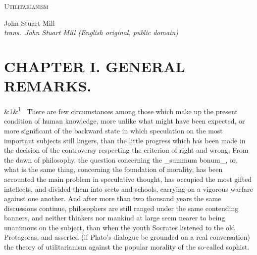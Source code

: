 \documentclass[12pt]{article}
\newcommand{\work}[1]{\begin{center}\LARGE\scshape #1\end{center}}
\newcommand{\attrib}[2]{\begin{center}\large #1\\[2pt]\small\itshape trans.\ #2\end{center}\vspace{1em}}
\newcommand{\para}[1][]{\par\noindent\ifx&#1&\else\textsuperscript{\footnotesize #1}~\fi}
\begin{document}
\work{Utilitarianism}
\attrib{John Stuart Mill}{John Stuart Mill (English original, public domain)}

\section*{CHAPTER I. GENERAL REMARKS.}

\para[1] There are few circumstances among those which make up the present condition of human knowledge, more unlike what might have been expected, or more significant of the backward state in which speculation on the most important subjects still lingers, than the little progress which has been made in the decision of the controversy respecting the criterion of right and wrong. From the dawn of philosophy, the question concerning the \_summum bonum\_, or, what is the same thing, concerning the foundation of morality, has been accounted the main problem in speculative thought, has occupied the most gifted intellects, and divided them into sects and schools, carrying on a vigorous warfare against one another. And after more than two thousand years the same discussions continue, philosophers are still ranged under the same contending banners, and neither thinkers nor mankind at large seem nearer to being unanimous on the subject, than when the youth Socrates listened to the old Protagoras, and asserted (if Plato's dialogue be grounded on a real conversation) the theory of utilitarianism against the popular morality of the so-called sophist.
\end{document}
